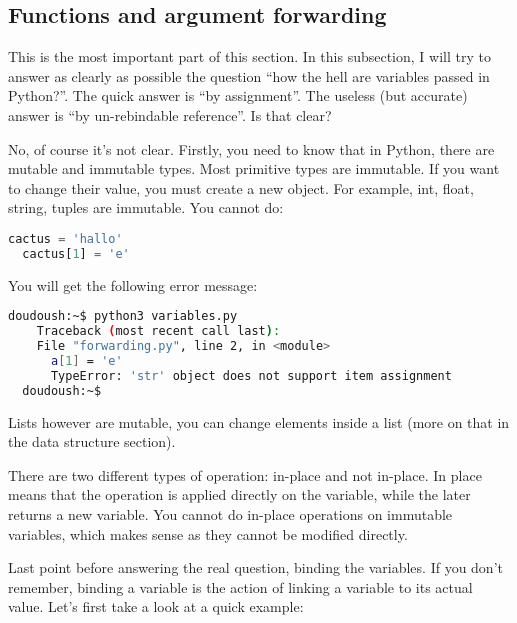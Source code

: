 \subsection{Functions and argument forwarding}

This is the most important part of this section. In this subsection, I will
try to answer as clearly as possible the question ``how the hell are variables
passed in Python?''. The quick answer is ``by assignment''. The useless (but accurate)
answer is ``by un-rebindable reference''. Is that clear?

\vspace{5mm}

No, of course it's not clear. Firstly, you need to know that in
Python, there are mutable and immutable types. Most primitive types
are immutable. If you want to change their value, you must create a
new object. For example, int, float, string, tuples are immutable. You
cannot do:

\begin{lstlisting}[language=python]
  cactus = 'hallo'
  cactus[1] = 'e'
\end{lstlisting}

You will get the following error message:

\begin{lstlisting}[language=bash]
  doudoush:~$ python3 variables.py
    Traceback (most recent call last):
    File "forwarding.py", line 2, in <module>
      a[1] = 'e'
      TypeError: 'str' object does not support item assignment
  doudoush:~$
\end{lstlisting}

Lists however are mutable, you can change elements inside a list
(more on that in the data structure section).

\vspace{5mm}

There are two different types of operation: in-place and not in-place.
In place means that the operation is applied directly on the variable, while the later
returns a new variable. You cannot do in-place operations on immutable variables,
which makes sense as they cannot be modified directly.

\vspace{5mm}

Last point before answering the real question, binding the variables. If you don't
remember, binding a variable is the action of linking a variable to its actual value.
Let's first take a look at a quick example:

